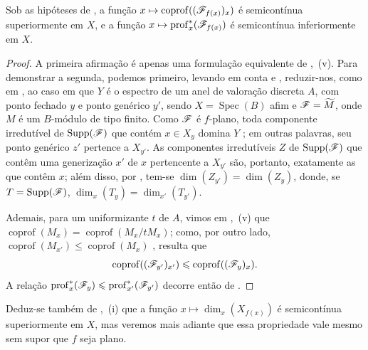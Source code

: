 \begin{corollary}[12.1.3]
\label{IV.12.1.3}
Sob as hipóteses de , a função
$x\mapsto\operatorname{coprof}((\sh{F}_{f(x)})_x)$
é semicontínua superiormente em $X$, e a função
$x\mapsto\operatorname{prof}_x^*(\sh{F}_{f(x)})$
 é semicontínua inferiormente em $X$.
\end{corollary}

\begin{proof}
A primeira afirmação é apenas uma formulação equivalente
de ,~(v). Para demonstrar a segunda,
podemos primeiro, levando em conta  e
, reduzir-nos, como em
, ao caso em que $Y$ é o espectro
de um anel de valoração discreta $A$, com ponto
fechado $y$ e ponto genérico $y'$, sendo
$X=\operatorname{Spec}(B)$ afim e
$\mathscr{F}=\widetilde M$, onde $M$ é um $B$-módulo
de tipo finito. Como $\mathscr{F}$ é $f$-plano, toda
componente irredutível de $\operatorname{Supp}(\mathscr{F})$
que contém $x\in X_y$ domina $Y$
; em outras palavras, seu ponto
genérico $z'$ pertence a $X_{y'}$. As componentes
irredutíveis $Z$ de $\operatorname{Supp}(\mathscr{F})$
que contêm uma generização $x'$ de $x$ pertencente
a $X_{y'}$ são, portanto, exatamente as que contêm
$x$; além disso, por , tem-se
$\dim(Z_{y'})=\dim(Z_y)$, donde, se
$T=\operatorname{Supp}(\mathscr{F})$,
$\dim_x(T_y)=\dim_{x'}(T_{y'})$.

Ademais, para um uniformizante $t$ de $A$, vimos em
,~(v) que
$\operatorname{coprof}(M_x)=
\operatorname{coprof}(M_x/tM_x)$; como, por outro lado,
$\operatorname{coprof}(M_{x'})\leq
\operatorname{coprof}(M_x)$ ,
resulta que
\[
\operatorname{coprof}((\mathscr{F}_{y'})_{x'})
\leqslant\operatorname{coprof}((\mathscr{F}_y)_x).
\]
A relação
$\operatorname{prof}_x^*(\mathscr{F}_y)\leqslant
\operatorname{prof}_{x'}^*(\mathscr{F}_{y'})$
decorre então de .
\end{proof}

\begin{remark}[12.1.4]
\label{IV.12.1.4}
Deduz-se também de ,~(i) que a função
$x\mapsto\dim_x(X_{f(x)})$ é semicontínua
superiormente em $X$, mas veremos mais adiante
 que essa propriedade vale mesmo sem
supor que $f$ seja plano.
\end{remark}

